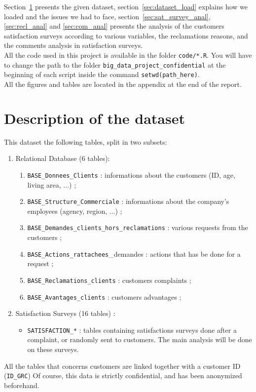 \documentclass[a4paper, 11pt]{article}
\newcommand{\tw}[1]{\texttt{#1}}
\begin{document}
    Section~\ref{sec:data_descr} presents the given dataset, section~\ref{sec:dataset_load} explains how we loaded and the issues we had to face, section~\ref{sec:sat_survey_anal},\ref{sec:recl_anal} and \ref{sec:com_anal} presents the analysis of the customers satisfaction surveys according to various variables, the reclamations reasons, and the comments analysis in satisfaction surveys. \\

    All the code used in this project is available in the folder \tw{code/*.R}. You will have to change the path to the folder \tw{big\_data\_project\_confidential} at the beginning of each script inside the command \tw{setwd(path\_here)}. \\

    All the figures and tables are located in the appendix at the end of the report.

\section{Description of the dataset} %
\label{sec:data_descr}


	This dataset the following tables, split in two subsets:
    \begin{enumerate}
    	\item Relational Database (6 tables):
    	\begin{enumerate}%
            \item \tw{BASE\_Donnees\_Clients} : informations about the customers (ID, age, living area, ...) ;
            \item \tw{BASE\_Structure\_Commerciale} : informations about the company's employees (agency, region, ...) ;
            \item \tw{BASE\_Demandes\_clients\_hors\_reclamations} : various requests from the customers ;
            \item \tw{BASE\_Actions\_rattachees}\_demandes : actions that has be done for a request ;
            \item \tw{BASE\_Reclamations\_clients} : customers complaints ;
            \item \tw{BASE\_Avantages\_clients} : customers advantages ;
        \end{enumerate}
        \item Satisfaction Surveys (16 tables) :
        \begin{itemize}
        	\item \tw{SATISFACTION\_*} : tables containing satisfactions surveys done after a complaint, or randomly sent to customers. The main analysis will be done on these surveys.
        \end{itemize}
	\end{enumerate}
    All the tables that concerns customers are linked together with a customer ID (\tw{ID\_GRC})
    Of course, this data is strictly confidential, and has been anonymized beforehand. 
\end{document}
